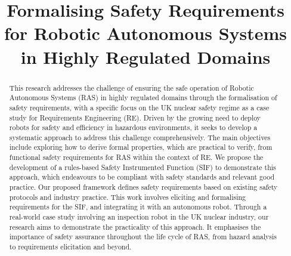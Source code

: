 \documentclass[conference]{IEEEtran}
\newcommand{\marienote}[1]{\todo[color=orange!65,inline]{Marie: #1}}
\begin{document}
\title{Formalising Safety Requirements for Robotic Autonomous Systems in Highly Regulated Domains
}



\maketitle

\begin{abstract}
This research addresses the challenge of ensuring the safe operation of Robotic Autonomous Systems (RAS) in highly regulated domains through the formalisation of safety requirements, with a specific focus on the UK nuclear safety regime as a case study for Requirements Engineering (RE). Driven by the growing need to deploy robots for safety and efficiency in hazardous environments, it seeks to develop a systematic approach to address this challenge comprehensively. The main objectives include exploring how to derive formal properties, which are practical to verify, from functional safety requirements for RAS within the context of RE. We propose the development of a rules-based Safety Instrumented Function (SIF) to demonstrate this approach, which endeavours to be compliant with safety standards and relevant good practice. Our proposed framework defines safety requirements based on existing safety protocols and industry practice. This work involves eliciting and formalising requirements for the SIF, and integrating it with an autonomous robot. Through a real-world case study involving an inspection robot in the UK nuclear industry, our research aims to demonstrate the practicality of this approach. It emphasises the importance of safety assurance throughout the life cycle of RAS, from hazard analysis to requirements elicitation and beyond.
\end{abstract}
\end{document}
